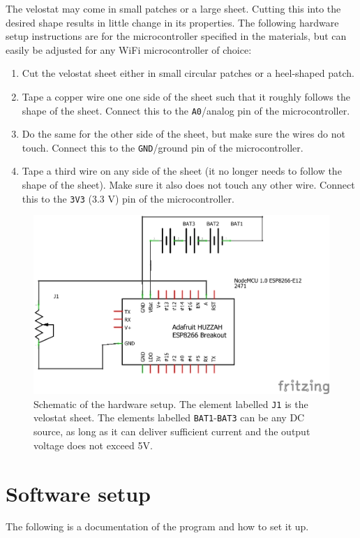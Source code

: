 \documentclass[12pt,a4paper,twoside]{article}
\begin{document}
The velostat may come in small patches or a large sheet. Cutting this into the desired shape results in little change in its properties. The following hardware setup instructions are for the microcontroller specified in the materials, but can easily be adjusted for any WiFi microcontroller of choice:

\begin{enumerate}
    \item Cut the velostat sheet either in small circular patches or a heel-shaped patch.
    \item Tape a copper wire one one side of the sheet such that it roughly follows the shape of the sheet. Connect this to the \texttt{A0}/analog pin of the microcontroller.
    \item Do the same for the other side of the sheet, but make sure the wires do not touch. Connect this to the \texttt{GND}/ground pin of the microcontroller.
    \item Tape a third wire on any side of the sheet (it no longer needs to follow the shape of the sheet). Make sure it also does not touch any other wire. Connect this to the \texttt{3V3} (3.3 V) pin of the microcontroller.
\end{enumerate}

\begin{figure}[h!]
	\centering
	\includegraphics[width=0.75\linewidth]{setup.png}
	\caption{Schematic of the hardware setup. The element labelled \texttt{J1} is the velostat sheet. The elements labelled \texttt{BAT1}-\texttt{BAT3} can be any DC source, as long as it can deliver sufficient current and the output voltage does not exceed 5V.}
	\label{fig:schematic}
\end{figure}

\section{Software setup}\label{sec:software}\medskip
The following is a documentation of the program and how to set it up.
\end{document}
